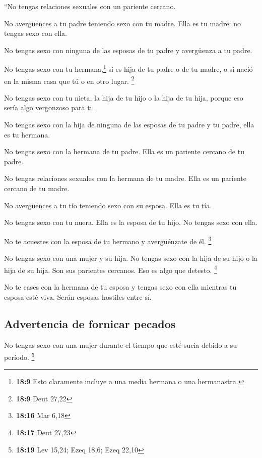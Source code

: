  ``No tengas relaciones sexuales con un pariente cercano.

 No avergüences a tu padre teniendo sexo con tu madre.
Ella es tu madre; no tengas sexo con ella.

 No tengas sexo con ninguna de las esposas de tu padre y
avergüenza a tu padre.

 No tengas sexo con tu hermana,\footnote{\textbf{18:9}
  Esto claramente incluye a una media hermana o una hermanastra.} si es
hija de tu padre o de tu madre, o si nació en la misma casa que tú o en
otro lugar. \footnote{\textbf{18:9} Deut 27,22}

 No tengas sexo con tu nieta, la hija de tu hijo o la
hija de tu hija, porque eso sería algo vergonzoso para ti.

 No tengas sexo con la hija de ninguna de las esposas de
tu padre y tu padre, ella es tu hermana.

 No tengas sexo con la hermana de tu padre. Ella es un
pariente cercano de tu padre.

 No tengas relaciones sexuales con la hermana de tu
madre. Ella es un pariente cercano de tu madre.

 No avergüences a tu tío teniendo sexo con su esposa.
Ella es tu tía.

 No tengas sexo con tu nuera. Ella es la esposa de tu
hijo. No tengas sexo con ella.

 No te acuestes con la esposa de tu hermano y
avergüénzate de él. \footnote{\textbf{18:16} Mar 6,18}

 No tengas sexo con una mujer y su hija. No tengas sexo
con la hija de su hijo o la hija de su hija. Son sus parientes cercanos.
Eso es algo que detesto. \footnote{\textbf{18:17} Deut 27,23}

 No te cases con la hermana de tu esposa y tengas sexo
con ella mientras tu esposa esté viva. Serán esposas hostiles entre sí.

\hypertarget{advertencia-de-fornicar-pecados}{%
\subsection{Advertencia de fornicar
pecados}\label{advertencia-de-fornicar-pecados}}

 No tengas sexo con una mujer durante el tiempo que esté
sucia debido a su período. \footnote{\textbf{18:19} Lev 15,24; Ezeq
  18,6; Ezeq 22,10}

